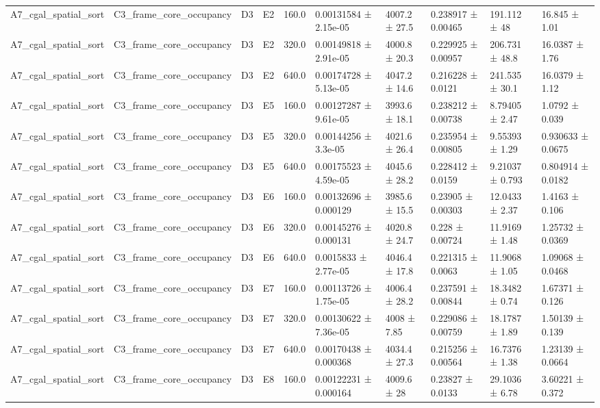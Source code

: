 \begin{table}
\begin{tabular}{llllllllll}
A7\_cgal\_spatial\_sort & C3\_frame\_core\_occupancy & D3 & E2 & 160.0 & 0.00131584 ± 2.15e-05 & 4007.2 ± 27.5 & 0.238917 ± 0.00465 & 191.112 ± 48 & 16.845 ± 1.01 \\
A7\_cgal\_spatial\_sort & C3\_frame\_core\_occupancy & D3 & E2 & 320.0 & 0.00149818 ± 2.91e-05 & 4000.8 ± 20.3 & 0.229925 ± 0.00957 & 206.731 ± 48.8 & 16.0387 ± 1.76 \\
A7\_cgal\_spatial\_sort & C3\_frame\_core\_occupancy & D3 & E2 & 640.0 & 0.00174728 ± 5.13e-05 & 4047.2 ± 14.6 & 0.216228 ± 0.0121 & 241.535 ± 30.1 & 16.0379 ± 1.12 \\
A7\_cgal\_spatial\_sort & C3\_frame\_core\_occupancy & D3 & E5 & 160.0 & 0.00127287 ± 9.61e-05 & 3993.6 ± 18.1 & 0.238212 ± 0.00738 & 8.79405 ± 2.47 & 1.0792 ± 0.039 \\
A7\_cgal\_spatial\_sort & C3\_frame\_core\_occupancy & D3 & E5 & 320.0 & 0.00144256 ± 3.3e-05 & 4021.6 ± 26.4 & 0.235954 ± 0.00805 & 9.55393 ± 1.29 & 0.930633 ± 0.0675 \\
A7\_cgal\_spatial\_sort & C3\_frame\_core\_occupancy & D3 & E5 & 640.0 & 0.00175523 ± 4.59e-05 & 4045.6 ± 28.2 & 0.228412 ± 0.0159 & 9.21037 ± 0.793 & 0.804914 ± 0.0182 \\
A7\_cgal\_spatial\_sort & C3\_frame\_core\_occupancy & D3 & E6 & 160.0 & 0.00132696 ± 0.000129 & 3985.6 ± 15.5 & 0.23905 ± 0.00303 & 12.0433 ± 2.37 & 1.4163 ± 0.106 \\
A7\_cgal\_spatial\_sort & C3\_frame\_core\_occupancy & D3 & E6 & 320.0 & 0.00145276 ± 0.000131 & 4020.8 ± 24.7 & 0.228 ± 0.00724 & 11.9169 ± 1.48 & 1.25732 ± 0.0369 \\
A7\_cgal\_spatial\_sort & C3\_frame\_core\_occupancy & D3 & E6 & 640.0 & 0.0015833 ± 2.77e-05 & 4046.4 ± 17.8 & 0.221315 ± 0.0063 & 11.9068 ± 1.05 & 1.09068 ± 0.0468 \\
A7\_cgal\_spatial\_sort & C3\_frame\_core\_occupancy & D3 & E7 & 160.0 & 0.00113726 ± 1.75e-05 & 4006.4 ± 28.2 & 0.237591 ± 0.00844 & 18.3482 ± 0.74 & 1.67371 ± 0.126 \\
A7\_cgal\_spatial\_sort & C3\_frame\_core\_occupancy & D3 & E7 & 320.0 & 0.00130622 ± 7.36e-05 & 4008 ± 7.85 & 0.229086 ± 0.00759 & 18.1787 ± 1.89 & 1.50139 ± 0.139 \\
A7\_cgal\_spatial\_sort & C3\_frame\_core\_occupancy & D3 & E7 & 640.0 & 0.00170438 ± 0.000368 & 4034.4 ± 27.3 & 0.215256 ± 0.00564 & 16.7376 ± 1.38 & 1.23139 ± 0.0664 \\
A7\_cgal\_spatial\_sort & C3\_frame\_core\_occupancy & D3 & E8 & 160.0 & 0.00122231 ± 0.000164 & 4009.6 ± 28 & 0.23827 ± 0.0133 & 29.1036 ± 6.78 & 3.60221 ± 0.372 \\

\end{tabular}
\end{table}
